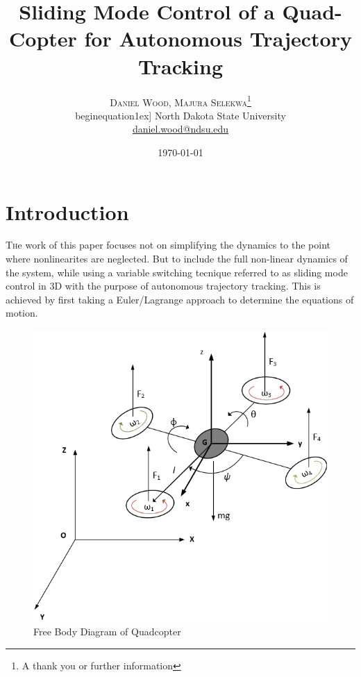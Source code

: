 \documentclass{article}
\title{Sliding Mode Control of a Quad-Copter for Autonomous Trajectory Tracking} %
\author{%
\textsc{Daniel Wood, Majura Selekwa}\thanks{A thank you or further information} \\begin{equation}1ex] %
\normalsize North Dakota State University \\ %
\normalsize \href{mailto:daniel.wood@ndsu.edu}{daniel.wood@ndsu.edu} %
}
\date{\today} %
\begin{document}
\maketitle


\section{Introduction}

\lettrine[nindent=0em,lines=3]{T} he work of this paper focuses not on simplifying the dynamics to the point where nonlinearites are neglected. But to include the full non-linear dynamics of the system, while using a variable switching tecnique referred to as sliding mode control in 3D with the purpose of autonomous trajectory tracking. This is achieved by first taking a Euler/Lagrange approach to determine the equations of motion.

\begin{figure}
\includegraphics[scale = 0.5]{drone_diag.png}
\caption{Free Body Diagram of Quadcopter}
\end{figure}
\end{document}
